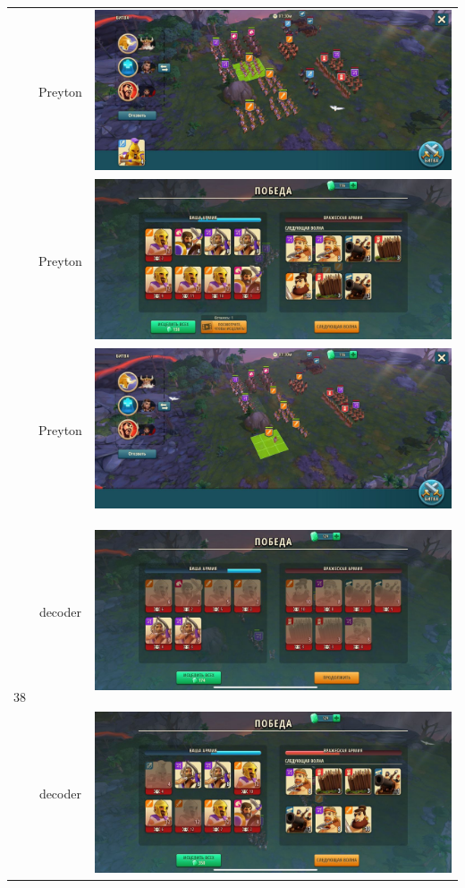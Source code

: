 \begin{longtable}{|c|c|c|}
	& Preyton &
	\includegraphics[width=0.75\linewidth]{./parts/media/TreasureHunt/38/Preyton/38.1.jpg} \\
	& Preyton &
	\includegraphics[width=0.75\linewidth]{./parts/media/TreasureHunt/38/Preyton/38_1.jpg} \\
	& Preyton &
	\includegraphics[width=0.75\linewidth]{./parts/media/TreasureHunt/38/Preyton/38.2.jpg} \\
	\hline
	\multirow{12}{*}{38} & decoder &
	\hypertarget{fight38}{\includegraphics[width=0.75\linewidth]{./parts/media/TreasureHunt/38/decoder/photo_2022-04-07_10-10-23.jpg}} \\
	& decoder &
	\includegraphics[width=0.75\linewidth]{./parts/media/TreasureHunt/38/decoder/photo_2022-04-07_10-10-16.jpg} \\

\end{longtable}
